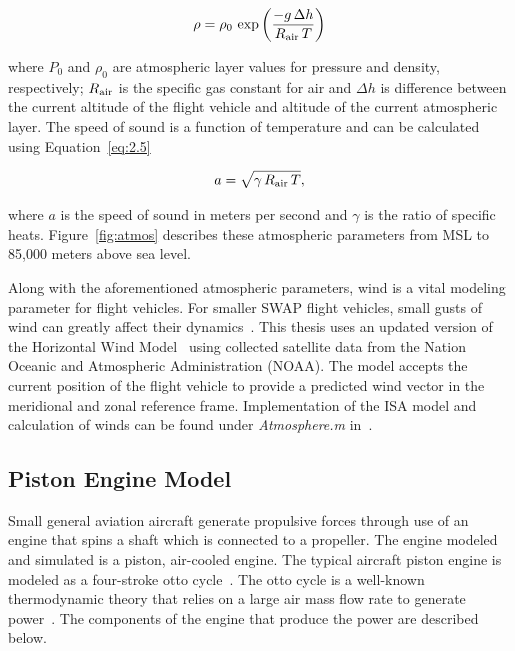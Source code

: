 \documentclass[12pt]{report}
\begin{document}
\begin{equation}
  \rho = \rho_0\,\exp\left({\frac{-g\,\Delta h}{R\textsubscript{air}\,T}}\right)
  \label{eq:2.4}
\end{equation}

where \(P_0\) and \(\rho_0\) are atmospheric layer values for pressure and density, respectively; \(R\textsubscript{air}\) is the specific gas constant for air and \(\Delta h\) is difference between the current altitude of the flight vehicle and altitude of the current atmospheric layer. The speed of sound is a function of temperature and can be calculated using Equation~\ref{eq:2.5}

\begin{equation}
  a = \sqrt{\gamma \, R\textsubscript{air}\,T},
  \label{eq:2.5}
\end{equation}

where \(a\) is the speed of sound in meters per second and \( \gamma \) is the ratio of specific heats. Figure~\ref{fig:atmos} describes these atmospheric parameters from MSL to 85,000 meters above sea level.

Along with the aforementioned atmospheric parameters, wind is a vital modeling parameter for flight vehicles. For smaller SWAP flight vehicles, small gusts of wind can greatly affect their dynamics~\cite{raymerAircraftDesignConceptual2018}. This thesis uses an updated version of the Horizontal Wind Model~\cite{drobEmpiricalModelEarth2008,drobUpdateHorizontalWind2015} using collected satellite data from the Nation Oceanic and Atmospheric Administration (NOAA). The model accepts the current position of the flight vehicle to provide a predicted wind vector in the meridional and zonal reference frame. Implementation of the ISA model and calculation of winds can be found under \textit{Atmosphere.m} in~\cite{millerNsm0014thesis1969}.

\subsection{Piston Engine Model}
Small general aviation aircraft generate propulsive forces through use of an engine that spins a shaft which is connected to a propeller. The engine modeled and simulated is a piston, air-cooled engine. The typical aircraft piston engine is modeled as a four-stroke otto cycle~\cite{raymerAircraftDesignConceptual2018}. The otto cycle is a well-known thermodynamic theory that relies on a large air mass flow rate to generate power~\cite{gudmundssonGeneralAviationAircraft2014}. The components of the engine that produce the power are described below.
\end{document}
